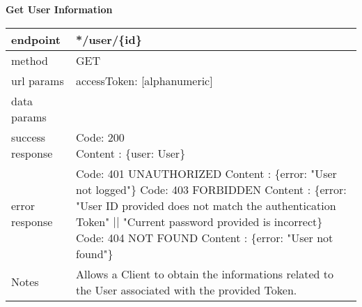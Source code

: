 \textbf{Get User Information} 

\begin{tabularx}{\linewidth}{| l | l |}
	\hline
	endpoint & */user/\{id\} \\
	\hline
	method & GET \\
	\hline
	url params & 	\parbox{0.7\textwidth}{
		\bigskip
		accessToken: [alphanumeric] \\
		\bigskip
	} \\
	\hline
	data params & \\
	\hline
	success response &
	\parbox{0.7\textwidth}{
		\bigskip
		Code: 200\\
		Content : \{user: User\}
		\bigskip
	} \\
	\hline
	error response &
	\parbox{0.7\textwidth}{
		\bigskip
		Code: 401 UNAUTHORIZED \\
		Content : \{error: "User not logged"\}\\
		Code: 403 FORBIDDEN \\
		Content : \{error: "User ID provided does not match the authentication Token" $||$ "Current password provided is incorrect\}\\
		Code: 404 NOT FOUND \\
		Content : \{error: "User not found"\}
		\bigskip
	} \\
	\hline
	Notes & \parbox{0.7\textwidth}{
		\bigskip
		Allows a Client to obtain the informations related to the User associated with the provided Token.
		\bigskip
	} \\
	\hline
\end{tabularx}


